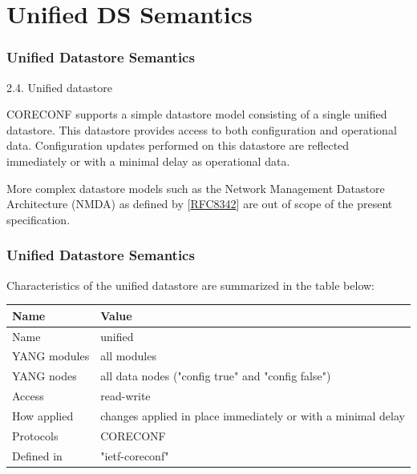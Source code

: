 \documentclass[aspectratio=169]{beamer}
\begin{document}
\section{Unified DS Semantics}
\begin{frame}[fragile]
  \frametitle{Unified Datastore Semantics}
  \begin{block}{2.4.  Unified datastore}

CORECONF supports a simple datastore model consisting of 
a single unified datastore.  This datastore provides 
access to both configuration and operational data.  
Configuration updates performed on this datastore are 
reflected immediately or with a minimal delay as 
operational data.

More complex datastore models such as the Network 
Management Datastore Architecture (NMDA) as defined 
by [\href{https://datatracker.ietf.org/doc/html/rfc8342}{RFC8342}] are out of scope of the present
specification.
  \end{block}

\end{frame}

\begin{frame}
  \frametitle{Unified Datastore Semantics}
Characteristics of the unified datastore are summarized in the table
below:

  \vspace{1em}
  \begin{tabular}{ | l | l | }
    \hline
    \textbf{Name}         &  \textbf{Value} \\ 
    \hline
    Name         &  unified \\
    \hline
    YANG modules &  all modules \\
    \hline
    YANG nodes   & all data nodes ("config true" and "config false") \\
    \hline
    Access       & read-write \\
    \hline
    How applied  &  changes applied in place immediately or with a    
                    minimal delay \\
    \hline
    Protocols    & CORECONF \\
    \hline
    Defined in   & "ietf-coreconf" \\
    \hline
  \end{tabular}
\end{frame}
\end{document}
